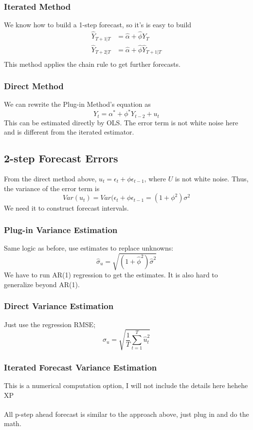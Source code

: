 \documentclass{article}
\begin{document}
\subsubsection{Iterated Method}
We know how to build a 1-step forecast, so it's is easy to build 
\begin{align*}
    \hat{Y}_{T+1|T} &= \hat{\alpha} + \hat{\phi}Y_T \\
    \hat{Y}_{T+2|T} &= \hat{\alpha} + \hat{\phi}\hat{Y}_{T+1|T} \\
\end{align*}
This method applies the chain rule to get further forecasts.

\subsubsection{Direct Method}
We can rewrite the Plug-in Method's equation as 
$$Y_t = \alpha^* + \phi^* Y_{t-2} + u_t$$
This can be estimated directly by OLS. The error term is not white noise here and is different from the iterated estimator.

\subsection{2-step Forecast Errors}
From the  direct method above, $u_t = \epsilon_t + \phi \epsilon_{t-1}$, where $U$ is not white noise. Thus, the variance of the error term is 
$$Var(u_t) = Var(\epsilon_t + \phi \epsilon_{t-1} = (1+\phi^2)\sigma^2$$
We need it to construct forecast intervals.

\subsubsection{Plug-in Variance Estimation}
Same logic as before, use estimates to replace unknowns:
$$\hat{\sigma}_u = \sqrt{(1+\hat{\phi}^2)\hat{\sigma}^2}$$
We have to run AR(1) regression to get the estimates. It is also hard to generalize beyond AR(1).

\subsubsection{Direct Variance Estimation}
Just use the regression RMSE;
$$\hat{\sigma}_u = \sqrt{\frac{1}{T}\sum_{t=1}^T \hat{u}_t^2}$$

\subsubsection{Iterated Forecast Variance Estimation}
This is a numerical computation option, I will not include the details here hehehe XP\\
\\
All p-step ahead forecast is similar to the approach above, just plug in and do the math.
\end{document}
